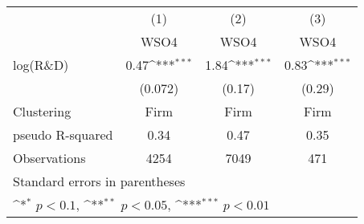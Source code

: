 {
\def\sym#1{\ifmmode^{#1}\else\(^{#1}\)\fi}
\begin{tabular}{l*{3}{c}}
\toprule
                    &\multicolumn{1}{c}{(1)}&\multicolumn{1}{c}{(2)}&\multicolumn{1}{c}{(3)}\\
                    &\multicolumn{1}{c}{WSO4}&\multicolumn{1}{c}{WSO4}&\multicolumn{1}{c}{WSO4}\\
\midrule
log(R\&D)           &        0.47\sym{***}&        1.84\sym{***}&        0.83\sym{***}\\
                    &     (0.072)         &      (0.17)         &      (0.29)         \\
\midrule
Clustering          &       Firm         &       Firm         &       Firm         \\
pseudo R-squared    &        0.34         &        0.47         &        0.35         \\
Observations        &        4254         &        7049         &         471         \\
\bottomrule
\multicolumn{4}{l}{\tiny Standard errors in parentheses}\\
\multicolumn{4}{l}{\tiny \sym{*} \(p<0.1\), \sym{**} \(p<0.05\), \sym{***} \(p<0.01\)}\\
\end{tabular}
}
